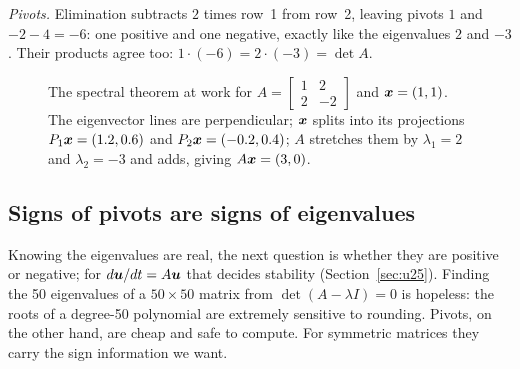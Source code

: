 \begin{example}
\emph{Pivots.} Elimination subtracts $2$ times row~1 from row~2, leaving pivots $1$ and
$-2-4=-6$: one positive and one negative, exactly like the eigenvalues $2$ and $-3$. Their
products agree too: $1\cdot(-6)=2\cdot(-3)=\det A$.
\end{example}

\begin{figure}[ht]\centering
{}
\caption{The spectral theorem at work for $A=\left[\begin{smallmatrix}1&2\\2&-2\end{smallmatrix}\right]$
and $\boldsymbol{x}=(1,1)$. The eigenvector lines are perpendicular; $\boldsymbol{x}$ splits into its projections
$P_1\boldsymbol{x}=(1.2,0.6)$ and $P_2\boldsymbol{x}=(-0.2,0.4)$; $A$ stretches them by $\lambda_1=2$ and
$\lambda_2=-3$ and adds, giving $A\boldsymbol{x}=(3,0)$.}
\label{fig:u29-projections}
\end{figure}

\subsection{Signs of pivots are signs of eigenvalues}

Knowing the eigenvalues are real, the next question is whether they are positive or negative;
for $d\boldsymbol{u}/dt=A\boldsymbol{u}$ that decides stability (Section~\ref{sec:u25}). Finding the 50
eigenvalues of a $50\times 50$ matrix from $\det(A-\lambda I)=0$ is hopeless: the roots of a
degree-50 polynomial are extremely sensitive to rounding. Pivots, on the other hand, are cheap
and safe to compute. For symmetric matrices they carry the sign information we want.

